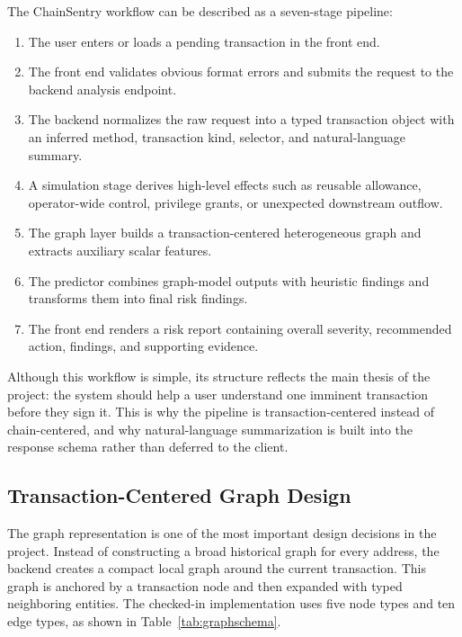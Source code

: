 \documentclass[11pt]{article}
\begin{document}
The ChainSentry workflow can be described as a seven-stage pipeline:

\begin{enumerate}[leftmargin=2em]
    \item The user enters or loads a pending transaction in the front end.
    \item The front end validates obvious format errors and submits the request to the backend analysis endpoint.
    \item The backend normalizes the raw request into a typed transaction object with an inferred method, transaction kind, selector, and natural-language summary.
    \item A simulation stage derives high-level effects such as reusable allowance, operator-wide control, privilege grants, or unexpected downstream outflow.
    \item The graph layer builds a transaction-centered heterogeneous graph and extracts auxiliary scalar features.
    \item The predictor combines graph-model outputs with heuristic findings and transforms them into final risk findings.
    \item The front end renders a risk report containing overall severity, recommended action, findings, and supporting evidence.
\end{enumerate}

Although this workflow is simple, its structure reflects the main thesis of the project: the system should help a user understand one imminent transaction before they sign it. This is why the pipeline is transaction-centered instead of chain-centered, and why natural-language summarization is built into the response schema rather than deferred to the client.

\subsection{Transaction-Centered Graph Design}

The graph representation is one of the most important design decisions in the project. Instead of constructing a broad historical graph for every address, the backend creates a compact local graph around the current transaction. This graph is anchored by a transaction node and then expanded with typed neighboring entities. The checked-in implementation uses five node types and ten edge types, as shown in Table~\ref{tab:graphschema}.
\end{document}
